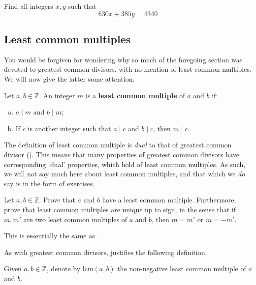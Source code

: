 \begin{exercise}
Find all integers $x,y$ such that
\[ 630x + 385y = 4340 \]
\end{exercise}

\subsection*{Least common multiples}

You would be forgiven for wondering why so much of the foregoing section was devoted to greatest common divisors, with no mention of least common multiples. We will now give the latter some attention.

\begin{definition}
\label{defLCM}
Let $a, b \in \mathbb{Z}$. An integer $m$ is a \textbf{least common multiple} of $a$ and $b$ if:
\begin{enumerate}[(a)]
\item $a \mid m$ and $b \mid m$;
\item If $c$ is another integer such that $a \mid c$ and $b \mid c$, then $m \mid c$.
\end{enumerate}
\end{definition}

The definition of least common multiple is \textit{dual} to that of greatest common divisor (). This means that many properties of greatest common divisors have corresponding `dual' properties, which hold of least common multiples. As such, we will not say much here about least common multiples, and that which we \textit{do} say is in the form of exercises.

\begin{exercise}
\label{exLCMExistsUnique}
Let $a,b \in \mathbb{Z}$. Prove that $a$ and $b$ have a least common multiple. Furthermore, prove that least common multiples are unique up to sign, in the sense that if $m,m'$ are two least common multiples of $a$ and $b$, then $m=m'$ or $m=-m'$.
\begin{backhint}
This is essentially the same as .
\end{backhint}
\end{exercise}

As with greatest common divisors,  justifies the following definition.

\begin{definition}
\label{defLCMFunction}
Given $a,b \in \mathbb{Z}$, denote by $\mathrm{lcm}(a,b)$  the non-negative least common multiple of $a$ and $b$.
\end{definition}

